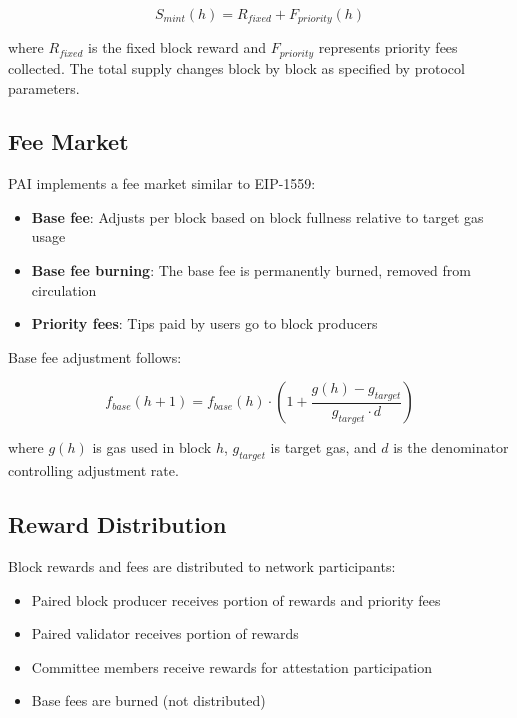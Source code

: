 \documentclass[11pt,a4paper]{article}
\begin{document}
\begin{equation}
S_{mint}(h) = R_{fixed} + F_{priority}(h)
\end{equation}

where $R_{fixed}$ is the fixed block reward and $F_{priority}$ represents priority fees collected. The total supply changes block by block as specified by protocol parameters.

\subsection{Fee Market}
PAI implements a fee market similar to EIP-1559:
\begin{itemize}
\item \textbf{Base fee}: Adjusts per block based on block fullness relative to target gas usage
\item \textbf{Base fee burning}: The base fee is permanently burned, removed from circulation
\item \textbf{Priority fees}: Tips paid by users go to block producers
\end{itemize}

Base fee adjustment follows:

\begin{equation}
f_{base}(h+1) = f_{base}(h) \cdot \left(1 + \frac{g(h) - g_{target}}{g_{target} \cdot d}\right)
\end{equation}

where $g(h)$ is gas used in block $h$, $g_{target}$ is target gas, and $d$ is the denominator controlling adjustment rate.

\subsection{Reward Distribution}
Block rewards and fees are distributed to network participants:
\begin{itemize}
\item Paired block producer receives portion of rewards and priority fees
\item Paired validator receives portion of rewards
\item Committee members receive rewards for attestation participation
\item Base fees are burned (not distributed)
\end{itemize}
\end{document}
